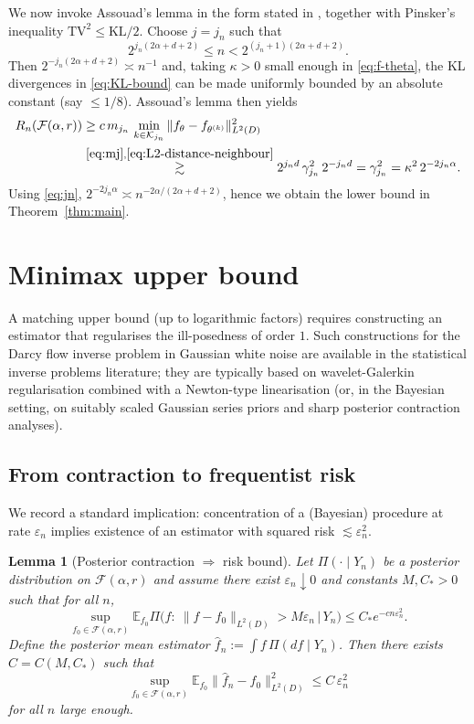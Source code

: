 \documentclass[11pt]{article}
\newtheorem{lemma}{Lemma}
\theoremstyle{definition}
\theoremstyle{remark}
\newcommand{\1}{\mathbf{1}}
\newcommand{\E}{\mathbb{E}}
\begin{document}
We now invoke Assouad's lemma in the form stated in \cite[Theorem~2.12]{Tsybakov2009}, together with Pinsker's inequality $\mathrm{TV}^2\le \mathrm{KL}/2$.
Choose $j=j_n$ such that
\begin{equation}\label{eq:jn}
2^{j_n(2\alpha+d+2)}\le n < 2^{(j_n+1)(2\alpha+d+2)}.
\end{equation}
Then $2^{-j_n(2\alpha+d+2)}\asymp n^{-1}$ and, taking $\kappa>0$ small enough in \eqref{eq:f-theta}, the KL divergences in \eqref{eq:KL-bound} can be made uniformly bounded by an absolute constant (say $\le 1/8$). Assouad's lemma then yields
\begin{align*}
R_n(\mathcal F(\alpha,r))
&\ge c\, m_{j_n}\,\min_{k\in\mathcal K_{j_n}}\|f_\theta-f_{\theta^{(k)}}\|_{L^2(D)}^2\\
&\stackrel{\eqref{eq:mj},\eqref{eq:L2-distance-neighbour}}{\gtrsim}
2^{j_n d}\,\gamma_{j_n}^2\,2^{-j_n d}
=\gamma_{j_n}^2
=\kappa^2\,2^{-2j_n\alpha}.
\end{align*}
Using \eqref{eq:jn}, $2^{-2j_n\alpha}\asymp n^{-2\alpha/(2\alpha+d+2)}$, hence we obtain the lower bound in Theorem~\ref{thm:main}.

\section{Minimax upper bound}\label{sec:upper}

A matching upper bound (up to logarithmic factors) requires constructing an estimator that regularises the ill-posedness of order $1$. Such constructions for the Darcy flow inverse problem in Gaussian white noise are available in the statistical inverse problems literature; they are typically based on wavelet-Galerkin regularisation combined with a Newton-type linearisation (or, in the Bayesian setting, on suitably scaled Gaussian series priors and sharp posterior contraction analyses).

\subsection{From contraction to frequentist risk}

We record a standard implication: concentration of a (Bayesian) procedure at rate $\varepsilon_n$ implies existence of an estimator with squared risk $\lesssim \varepsilon_n^2$.

\begin{lemma}[Posterior contraction $\Rightarrow$ risk bound]\label{lem:contraction-risk}
Let $\Pi(\cdot\mid Y_n)$ be a posterior distribution on $\mathcal F(\alpha,r)$ and assume there exist $\varepsilon_n\downarrow0$ and constants $M,C_*>0$ such that for all $n$,
\[
\sup_{f_0\in\mathcal F(\alpha,r)}
\E_{f_0}\Pi\bigl(f:\ \|f-f_0\|_{L^2(D)}>M\varepsilon_n \,\big|\,Y_n\bigr)
\le C_* e^{-c n\varepsilon_n^2}.
\]
Define the posterior mean estimator $\hat f_n:=\int f\,\Pi(df\mid Y_n)$.
Then there exists $C=C(M,C_*)$ such that
\[
\sup_{f_0\in\mathcal F(\alpha,r)}
\E_{f_0}\|\hat f_n-f_0\|_{L^2(D)}^2
\le C\,\varepsilon_n^2
\]
for all $n$ large enough.
\end{lemma}
\end{document}
